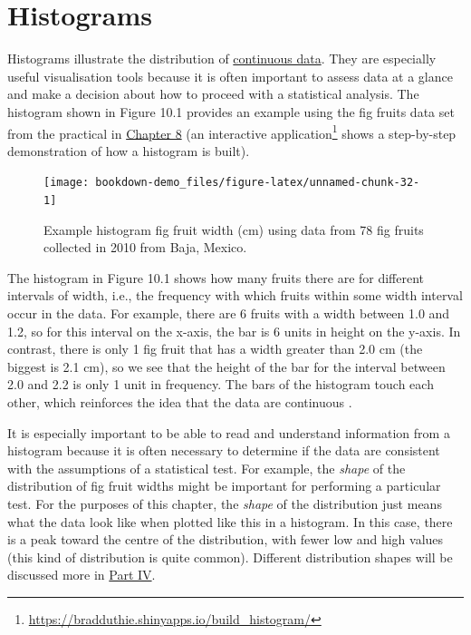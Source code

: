 \documentclass[
  openany]{scrbook}
\begin{document}
\hypertarget{histograms}{%
\section{Histograms}\label{histograms}}

Histograms illustrate the distribution of \protect\hyperlink{Chapter_5}{continuous data}.
They are especially useful visualisation tools because it is often important to assess data at a glance and make a decision about how to proceed with a statistical analysis.
The histogram shown in Figure 10.1 provides an example using the fig fruits data set from the practical in \protect\hyperlink{Chapter_8}{Chapter 8} (an interactive application\footnote{\url{https://bradduthie.shinyapps.io/build_histogram/}} shows a step-by-step demonstration of how a histogram is built).

\begin{figure}
\texttt{[image: bookdown-demo\_files/figure-latex/unnamed-chunk-32-1]} \caption{Example histogram fig fruit width (cm) using data from 78 fig fruits collected in 2010 from Baja, Mexico.}\label{fig:unnamed-chunk-32}
\end{figure}

The histogram in Figure 10.1 shows how many fruits there are for different intervals of width, i.e., the frequency with which fruits within some width interval occur in the data.
For example, there are 6 fruits with a width between 1.0 and 1.2, so for this interval on the x-axis, the bar is 6 units in height on the y-axis.
In contrast, there is only 1 fig fruit that has a width greater than 2.0 cm (the biggest is 2.1 cm), so we see that the height of the bar for the interval between 2.0 and 2.2 is only 1 unit in frequency.
The bars of the histogram touch each other, which reinforces the idea that the data are continuous \citep{Dytham2011, Sokal1995}.

It is especially important to be able to read and understand information from a histogram because it is often necessary to determine if the data are consistent with the assumptions of a statistical test.
For example, the \emph{shape} of the distribution of fig fruit widths might be important for performing a particular test.
For the purposes of this chapter, the \emph{shape} of the distribution just means what the data look like when plotted like this in a histogram.
In this case, there is a peak toward the centre of the distribution, with fewer low and high values (this kind of distribution is quite common).
Different distribution shapes will be discussed more in \protect\hyperlink{Week4}{Part IV}.
\end{document}
